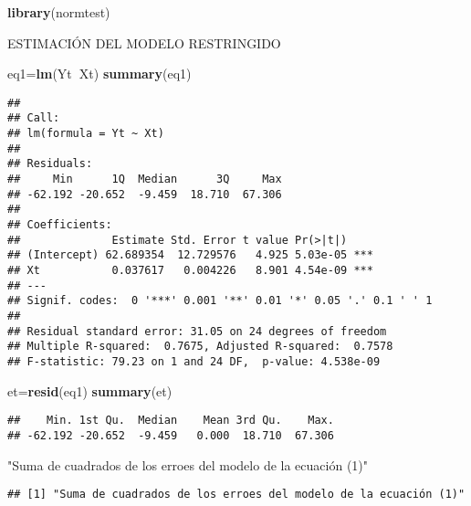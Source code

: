 \documentclass[
]{article}
\newenvironment{Shaded}{\begin{snugshade}}{\end{snugshade}}
\newcommand{\KeywordTok}[1]{\textcolor[rgb]{0.13,0.29,0.53}{\textbf{#1}}}
\newcommand{\NormalTok}[1]{#1}
\newcommand{\OperatorTok}[1]{\textcolor[rgb]{0.81,0.36,0.00}{\textbf{#1}}}
\newcommand{\StringTok}[1]{\textcolor[rgb]{0.31,0.60,0.02}{#1}}
\begin{document}
\begin{Shaded}
\begin{Highlighting}[]
\KeywordTok{library}\NormalTok{(normtest)}
\end{Highlighting}
\end{Shaded}

ESTIMACIÓN DEL MODELO RESTRINGIDO

\begin{Shaded}
\begin{Highlighting}[]
\NormalTok{eq1=}\KeywordTok{lm}\NormalTok{(Yt}\OperatorTok{~}\NormalTok{Xt)}
\KeywordTok{summary}\NormalTok{(eq1)}
\end{Highlighting}
\end{Shaded}

\begin{verbatim}
## 
## Call:
## lm(formula = Yt ~ Xt)
## 
## Residuals:
##     Min      1Q  Median      3Q     Max 
## -62.192 -20.652  -9.459  18.710  67.306 
## 
## Coefficients:
##              Estimate Std. Error t value Pr(>|t|)    
## (Intercept) 62.689354  12.729576   4.925 5.03e-05 ***
## Xt           0.037617   0.004226   8.901 4.54e-09 ***
## ---
## Signif. codes:  0 '***' 0.001 '**' 0.01 '*' 0.05 '.' 0.1 ' ' 1
## 
## Residual standard error: 31.05 on 24 degrees of freedom
## Multiple R-squared:  0.7675, Adjusted R-squared:  0.7578 
## F-statistic: 79.23 on 1 and 24 DF,  p-value: 4.538e-09
\end{verbatim}

\begin{Shaded}
\begin{Highlighting}[]
\NormalTok{et=}\KeywordTok{resid}\NormalTok{(eq1)}
\KeywordTok{summary}\NormalTok{(et)}
\end{Highlighting}
\end{Shaded}

\begin{verbatim}
##    Min. 1st Qu.  Median    Mean 3rd Qu.    Max. 
## -62.192 -20.652  -9.459   0.000  18.710  67.306
\end{verbatim}

\begin{Shaded}
\begin{Highlighting}[]
\StringTok{"Suma de cuadrados de los erroes del modelo de la ecuación (1)"}
\end{Highlighting}
\end{Shaded}

\begin{verbatim}
## [1] "Suma de cuadrados de los erroes del modelo de la ecuación (1)"
\end{verbatim}
\end{document}
